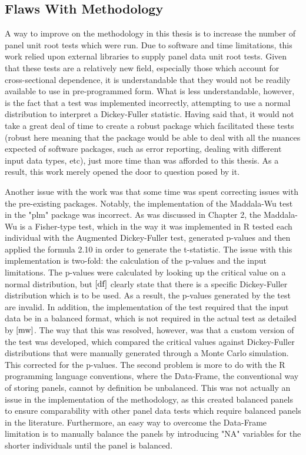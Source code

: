 \subsection{Flaws With Methodology}

A way to improve on the methodology in this thesis is to increase the number of panel unit root tests which were run. Due to software and time limitations, this work relied upon external libraries to supply panel data unit root tests. Given that these tests are a relatively new field, especially those which account for cross-sectional dependence, it is understandable that they would not be readily available to use in pre-programmed form. What is less understandable, however, is the fact that a test was implemented incorrectly, attempting to use a normal distribution to interpret a Dickey-Fuller statistic. Having said that, it would not take a great deal of time to create a robust package which facilitated these tests (robust here meaning that the package would be able to deal with all the nuances expected of software packages, such as error reporting, dealing with different input data types, etc), just more time than was afforded to this thesis. As a result, this work merely opened the door to question posed by it.


Another issue with the work was that some time was spent correcting issues with the pre-existing packages. Notably, the implementation of the Maddala-Wu test in the "plm" package was incorrect. As was discussed in Chapter 2, the Maddala-Wu is a Fisher-type test, which in the way it was implemented in R tested each individual with the Augmented Dickey-Fuller test, generated p-values and then applied the formula 2.10 in order to generate the t-statistic. The issue with this implementation is two-fold: the calculation of the p-values and the input limitations. The p-values were calculated by looking up the critical value on a normal distribution, but $\cite{df}$ clearly state that there is a specific Dickey-Fuller distribution which is to be used. As a result, the p-values generated by the test are invalid. In addition, the implementation of the test required that the input data be in a balanced format, which is not required in the actual test as detailed by $\cite{mw}$. The way that this was resolved, however, was that a custom version of the test was developed, which compared the critical values against Dickey-Fuller distributions that were manually generated through a Monte Carlo simulation. This corrected for the p-values. The second problem is more to do with the R programming language conventions, where the Data-Frame, the conventional way of storing panels, cannot by definition be unbalanced. This was not actually an issue in the implementation of the methodology, as this created balanced panels to ensure comparability with other panel data tests which require balanced panels in the literature. Furthermore, an easy way to overcome the Data-Frame limitation is to manually balance the panels by introducing "NA" variables for the shorter individuals until the panel is balanced.




